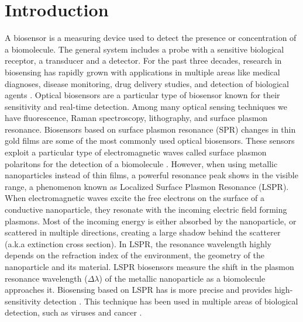 \chapter{Introduction} \label{chap:intro}

A biosensor is a measuring device used to detect the presence or concentration of a biomolecule. The general system includes 
a probe with a sensitive biological receptor, a transducer and a detector. For the past three decades, research in biosensing 
has rapidly grown with applications in multiple areas like medical diagnoses, disease monitoring, drug delivery studies, 
and detection of biological agents \cite{Turner2000, Mohanty2006, Mehrotra2016}. Optical biosensors are a particular type of biosensor 
known for their sensitivity and real-time detection. Among many optical sensing techniques we have fluorescence, Raman spectroscopy, lithography, 
and surface plasmon resonance. Biosensors based on surface plasmon resonance (SPR) changes in thin gold films are some of the most 
commonly used optical biosensors.  These sensors exploit a particular type of electromagnetic waves called surface plasmon polaritons for the
detection of a biomolecule \cite{Homola2008}. However, when using metallic nanoparticles instead of thin films, a powerful resonance peak 
shows in the visible range, a phenomenon known as Localized Surface Plasmon Resonance (LSPR). When electromagnetic waves excite the free electrons on 
the surface of a conductive nanoparticle, they resonate with the incoming electric field forming plasmons. Most of the incoming energy is either 
absorbed by the nanoparticle, or scattered in multiple directions, creating a large shadow behind the scatterer (a.k.a extinction cross section). In LSPR, 
the resonance wavelength highly depends on the refraction index of the environment, the geometry of the nanoparticle and its material. LSPR biosensors measure 
the shift in the plasmon resonance wavelength ($\Delta\lambda$) of the metallic nanoparticle as a biomolecule approaches it. Biosensing based on LSPR has 
is more precise and provides high-sensitivity detection \cite{Sepulveda2009}. This technique has been used in multiple areas of biological detection, 
such as viruses and cancer \cite{Wang2010, Liu2014, Zhu2016}. 

